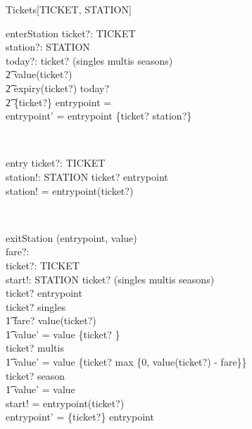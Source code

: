 \begin{class}{Tickets}[TICKET, STATION]
\begin{op}{enterStation}
ticket?: TICKET \\ 
station?: STATION \\ 
today?:  \nat  
\where
 ticket? \in (singles \cup multis \cup seasons) \land \\ 
\t2 value(ticket?)  \land \\ 
\t2 expiry(ticket?) \geq today? \land \\ 
\t2 \{ticket?\} \dres entrypoint = \emptyset \\ 
entrypoint' = entrypoint \cup \{ticket? \mapsto station?\} \\ 
\end{op} \\ 
\begin{op}{entry}
ticket?: TICKET \\ 
station!: STATION 
\where
 ticket? \in  \dom entrypoint \\ 
station! = entrypoint(ticket?) \\ 
\end{op} \\ 
\begin{op}{exitStation}
\Delta (entrypoint, value)\\
fare?:  \nat  \\ 
ticket?: TICKET \\ 
start!: STATION 
\where
 ticket? \in (singles \cup multis \cup seasons) \land \\ 
ticket? \in  \dom entrypoint \\ 
ticket? \in singles \implies\\
\t1 fare? \leq value(ticket?) \land \\ 
\t1 value' = value \oplus \{ticket? \}\\
ticket? \in multis \implies\\ 
\t1 value' = value \oplus \{ticket? \mapsto max \{0, value(ticket?) - fare\}\}\\ 
ticket? \in season \implies\\
\t1 value' = value\\
start! = entrypoint(ticket?) \\ 
entrypoint' = \{ticket?\} \ndres entrypoint
\end{op} 
\end{class} 
